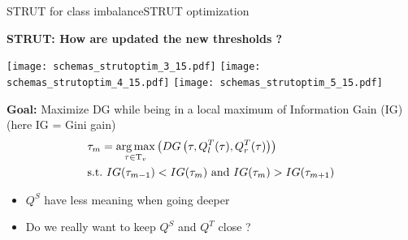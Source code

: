 
\begin{frame}{STRUT for class imbalance}{STRUT optimization}
\begin{minipage}[t]{0.4\linewidth}
    \vspace{0pt}
    \centering
    \textbf{STRUT: How are updated the new thresholds ?}\\
    \renewcommand{\ratio}{1.0}
    \begin{overprint}
        \texttt{[image: schemas\_strutoptim\_3\_15.pdf]}
        \texttt{[image: schemas\_strutoptim\_4\_15.pdf]}
        \texttt{[image: schemas\_strutoptim\_5\_15.pdf]}
    \end{overprint}
\end{minipage}\hfill
\begin{minipage}[t]{0.55\linewidth}
    \vspace{0pt}
    
    \textbf{Goal: } Maximize DG while being in a local maximum of Information Gain (IG) (here IG = Gini gain)
    \pause \pause \pause
    \begin{align*}
        &\tau_{m} = \operatorname*{arg\,max}_{\tau \in \mathrm{T}_{v}}\left(DG\left(  \tau ,  Q_{l}^{T}(\tau), Q_{r}^{T}(\tau)\right)\right) \\
        &\text{s.t.\ } IG(\tau_{m-1}) < IG(\tau_{m}) \text{ and } IG(\tau_{m}) > IG(\tau_{m+1})
    \end{align*}
    \vspace{1cm}

    \pause
    \begin{itemize}
        \item  $Q^S$ have less meaning when going deeper
        \item  Do we really want to keep $Q^S$ and $Q^T$ close ?
    \end{itemize}
\end{minipage}

\end{frame}

